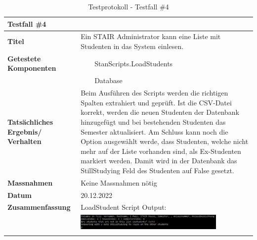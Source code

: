 \documentclass[a4paper, table]{article}
\newcommand{\tabitem}{~~\llap{\textbullet}~~}
\begin{document}
\begin{longtable}[h]{|p{9em}|p{31em}|}
    \hline
    \multicolumn{2}{|l|}{\textbf{Testfall \#4}} \\
    \hline
    \textbf{Titel} & Ein STAIR Administrator kann eine Liste mit Studenten in das System einlesen. \\
    \hline
    \textbf{Getestete Komponenten} & 
        \tabitem StanScripts.LoadStudents \\*
     &  \tabitem Database \\
    \hline
    \textbf{Tatsächliches Ergebnis/ Verhalten} &  
        Beim Ausführen des Scripts werden die richtigen Spalten extrahiert und geprüft. 
        Ist die \gls{CSV}-Datei korrekt, werden die neuen Studenten der Datenbank hinzugefügt und bei bestehenden Studenten das Semester aktualisiert.
        Am Schluss kann noch die Option ausgewählt werde, dass Studenten, welche nicht mehr auf der Liste vorhanden sind, als Ex-Studenten markiert werden. 
        Damit wird in der Datenbank das StillStudying Feld des Studenten auf False gesetzt. \\
    \hline
    \textbf{Massnahmen} & Keine Massnahmen nötig \\
    \hline
    \textbf{Datum} & 20.12.2022\\
    \hline
    \textbf{Zusammenfassung} & LoadStudent Script Output: \\*
     & \includegraphics[width=0.8\textwidth]{img/Tests/4_Test_LoadStudents.png} \\
    \hline
    \caption{Testprotokoll - Testfall \#4}
\end{longtable}
\end{document}
